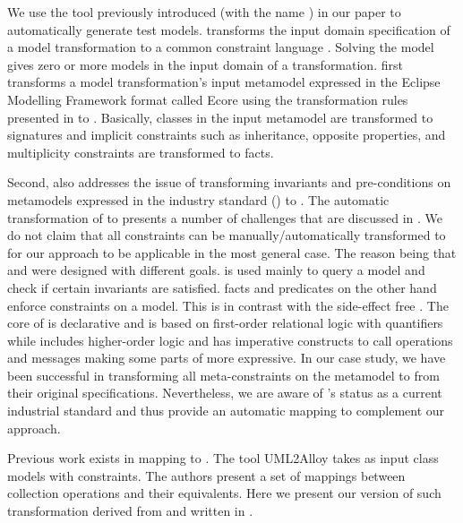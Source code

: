 We use the tool {\Pramana} previously introduced (with the name {\Cartier}) in our paper \cite{sen2008} to automatically generate test models. {\Pramana} transforms the input domain specification of a model transformation to a common constraint language {\Alloy}. Solving the {\Alloy} model gives zero or more models in the input domain of a transformation. {\Pramana} first transforms a model transformation's  input metamodel expressed in the Eclipse Modelling Framework \cite{emf2004} format called Ecore using the transformation rules presented in \cite{sen2008} to {\Alloy}. Basically, classes in the input metamodel are transformed to {\Alloy} signatures and implicit constraints such as inheritance, opposite properties, and multiplicity constraints are transformed to {\Alloy} facts. 

Second, {\Pramana} also addresses the issue of transforming invariants and pre-conditions on metamodels expressed in the industry standard {\textOCL} ({\OCL}) to {\Alloy}. The automatic transformation of  {\OCL} to {\Alloy} presents a number of challenges that are discussed in \cite{AnastasakisBGR07}. We do not claim that all {\OCL} constraints can be manually/automatically transformed to {\Alloy} for our approach to be applicable in the most general case. The reason being that {\OCL} and {\Alloy} were designed with different goals. {\OCL} is used mainly to query a model and check if certain invariants are satisfied. {\Alloy} facts and predicates on the other hand enforce constraints on a model. This is in contrast with the side-effect free {\OCL}. The core of {\Alloy} is declarative and is based on first-order relational logic with quantifiers while {\OCL} includes higher-order logic and has imperative constructs to call operations and messages making some parts of {\OCL} more expressive. In our case study, we have been successful in transforming all meta-constraints on the {\UMLCD} metamodel to {\Alloy} from their original {\OCL} specifications. Nevertheless, we are aware of {\OCL}'s status as a current industrial standard and thus provide an automatic mapping to complement our approach.


Previous work exists in mapping {\OCL} to {\Alloy}. The tool UML2Alloy \cite{anastasakis2009} takes as input {\UML} class models with {\OCL} constraints. The authors present a set of mappings between {\OCL} collection operations and their {\Alloy} equivalents. Here we present our version of such transformation derived from \cite{anastasakis2009} and written in  {\Kermeta}.


